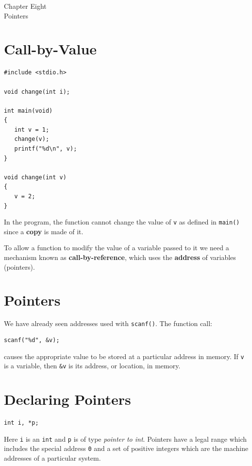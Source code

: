 \documentclass[a4,portraitt]{slides}
\begin{document}
\newpage
\begin{center}
{\Large Chapter Eight\\ Pointers}
\end{center}

\section*{Call-by-Value}

\begin{verbatim}
#include <stdio.h>

void change(int i);

int main(void)
{
   int v = 1;
   change(v);
   printf("%d\n", v);
}

void change(int v)
{
   v = 2;
}
\end{verbatim}

\newpage
In the program, the function cannot change
the value of \verb^v^ as defined in \verb^main()^ since
a {\bf copy} is made of it.

To allow a function to modify the value of a variable
passed to it we need a mechanism known as
{\bf call-by-reference}, which uses the {\bf address}
of variables (pointers).


\newpage
\section*{Pointers}

We have already seen addresses used with \verb^scanf()^.
The function call:
\begin{verbatim}
scanf("%d", &v);
\end{verbatim}
causes the appropriate value to be stored at a particular
address in memory.
If \verb^v^ is  a variable, then \verb^&v^ is its
address, or location, in memory.

{\samepage
\section*{Declaring Pointers}
\begin{verbatim}
int i, *p;
\end{verbatim}
Here \verb^i^ is an \verb^int^ and \verb^p^ is of type
{\it pointer to int}. Pointers have a legal range which
includes the special address \verb^0^ and a set of positive
integers which are the machine addresses of a particular
system.
}
\end{document}

